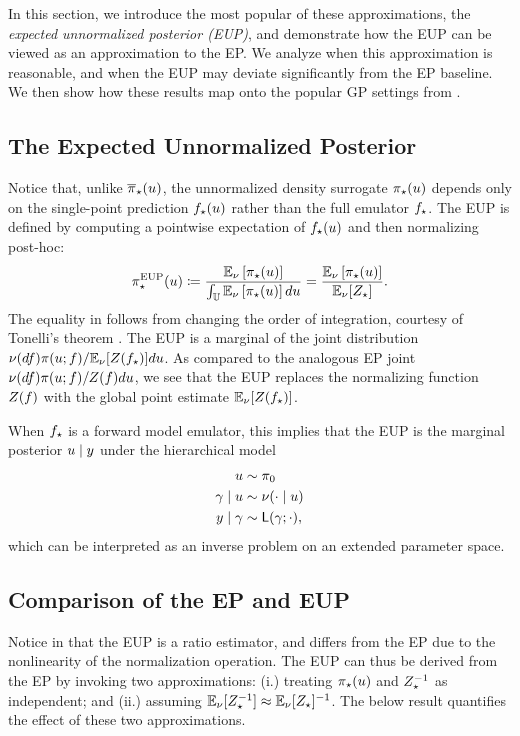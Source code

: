 \documentclass[12pt]{article}
\begin{document}
In this section, we introduce the most popular of these approximations, the 
\textit{expected unnormalized posterior (EUP)}, and demonstrate 
how the EUP can be viewed as an approximation to the EP.
We analyze when this approximation is reasonable, and when the EUP may 
deviate significantly from the EP baseline. We then show how these results map 
onto the popular GP settings from .

\subsection{The Expected Unnormalized Posterior} \label{sec:eup}
Notice that, unlike ${\overline{\pi}}_{\star}(u)$, the unnormalized density surrogate
${\pi}_{\star}(u)$ depends only on the single-point prediction ${f}_{\star}(u)$
rather than the full emulator ${f}_{\star}$. The EUP is defined by computing
a pointwise expectation of ${f}_{\star}(u)$ and then normalizing post-hoc:
\begin{equation}
{\pi}_{\star}^{\mathrm{EUP}}(u) \coloneqq 
\frac{\mathbb{E}_{\nu} \left[{\pi}_{\star}(u) \right]}{\int_{\mathbb{U}} \mathbb{E}_{\nu}\left[{\pi}_{\star}(u) \right] du}
= \frac{\mathbb{E}_{\nu}\left[{\pi}_{\star}(u) \right]}{\mathbb{E}_{\nu}[{Z}_{\star}]}. \label{eq:post-approx-EL} 
\end{equation}
The equality in  follows from
changing the order of integration, courtesy of Tonelli's theorem \citep{StuartTeck1}. The EUP
is a marginal of the joint distribution 
$\nu(df) \pi(u; f) / \mathbb{E}_{\nu}[Z({f}_{\star})] du$. 
As compared to the analogous EP joint
$\nu(df) \pi(u; f) / Z(f) du$,
we see that the EUP replaces the normalizing function $Z(f)$ with
the global point estimate $\mathbb{E}_{\nu}[Z({f}_{\star})] $.

When ${f}_{\star}$ is a forward model emulator, this implies that the EUP is the 
marginal posterior $u \mid y$ under the hierarchical model 
\begin{align}
u &\sim \pi_0 \label{eq:el-prob-model} \\
\gamma \mid u &\sim \nu(\cdot \mid u) \nonumber \\
y \mid \gamma &\sim \mathsf{L}(\gamma; \cdot), \nonumber
\end{align}
which can be interpreted as an inverse problem on an extended parameter space.

\subsection{Comparison of the EP and EUP}
Notice in  that the EUP is a ratio estimator, and differs from 
the EP due to the nonlinearity of the normalization operation. The EUP can thus 
be derived from the EP by invoking two approximations: 
(i.) treating ${\pi}_{\star}(u)$ and ${Z}_{\star}^{-1}$ as independent; and 
(ii.) assuming $\mathbb{E}_{\nu}[{Z}_{\star}^{-1}] \approx \mathbb{E}_{\nu}[{Z}_{\star}]^{-1}$.
The below result quantifies the effect of these two approximations.
\end{document}
